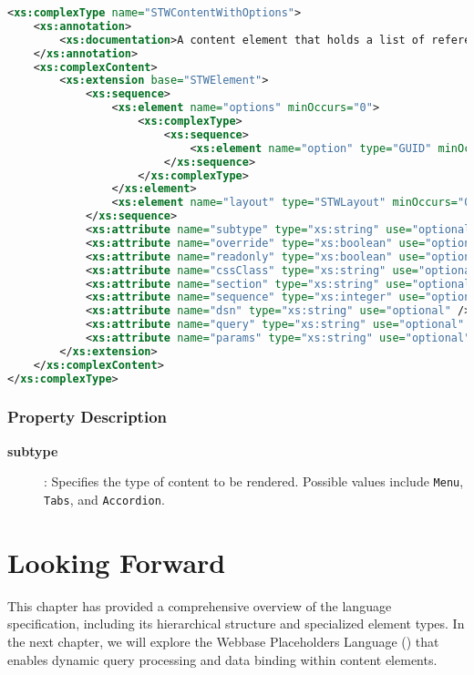 \begin{lstlisting}[language=XML,caption={STWContentWithOptions Type Definition}]
<xs:complexType name="STWContentWithOptions">
    <xs:annotation>
        <xs:documentation>A content element that holds a list of references (options) to other STWElements, instead of nested child elements. Useful for menus and tabs where content is sourced from elsewhere.</xs:documentation>
    </xs:annotation>
    <xs:complexContent>
        <xs:extension base="STWElement">
            <xs:sequence>
                <xs:element name="options" minOccurs="0">
                    <xs:complexType>
                        <xs:sequence>
                            <xs:element name="option" type="GUID" minOccurs="0" maxOccurs="unbounded" />
                        </xs:sequence>
                    </xs:complexType>
                </xs:element>
                <xs:element name="layout" type="STWLayout" minOccurs="0" />
            </xs:sequence>
            <xs:attribute name="subtype" type="xs:string" use="optional" />
            <xs:attribute name="override" type="xs:boolean" use="optional" />
            <xs:attribute name="readonly" type="xs:boolean" use="optional" />
            <xs:attribute name="cssClass" type="xs:string" use="optional" />
            <xs:attribute name="section" type="xs:string" use="optional" />
            <xs:attribute name="sequence" type="xs:integer" use="optional" />
            <xs:attribute name="dsn" type="xs:string" use="optional" />
            <xs:attribute name="query" type="xs:string" use="optional" />
            <xs:attribute name="params" type="xs:string" use="optional" />
        </xs:extension>
    </xs:complexContent>
</xs:complexType>
\end{lstlisting}

\subsubsection{Property Description}

\begin{description}
\item[\textbf{subtype}]: Specifies the type of content to be rendered. Possible values include \texttt{Menu}, \texttt{Tabs}, and \texttt{Accordion}.
\end{description}

\section{Looking Forward}
\label{sec:wbdl-forward}

This chapter has provided a comprehensive overview of the \wbdl{} language specification, including its hierarchical structure and specialized element types. In the next chapter, we will explore the Webbase Placeholders Language (\wbpl{}) that enables dynamic query processing and data binding within \wbdl{} content elements.
